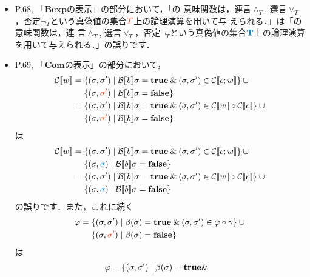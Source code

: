 \documentclass[12pt,titlepage,twoside,openright,dvipdfmx]{jsbook}
\newcommand\old[1]{%
  \textcolor[rgb]{1.0,0.25,0.1}{#1}%
  }
\newcommand\new[1]{%
  \textcolor[rgb]{0,0.55,1.0}{#1}%
  }
\theoremstyle{definition}
\begin{document}
\begin{itemize}
  \ifnum{}
  \ifnum{}
\item P.68,
  「$\mathbf{Bexp}$の表示」の部分において，「\termbooleanexpression{}の
  意味関数は，連言$\wedge_T$,
  選言$\vee_T$，否定$\neg_T$という真偽値の集合$\old{T}$上の論理演算を用いて与
  えられる．」は「\termbooleanexpression{}の意味関数は，連
  言$\wedge_T$,
  選言$\vee_T$，否定$\neg_T$という真偽値の集合$\new{\mathbf{T}}$上の論理演算
  を用いて与えられる．」の誤りです．
\item P.69, 「$\mathbf{Com}$の表示」の部分において，
  \begin{align*}
      \denotation{C}{w} = {} & \{(\sigma,\sigma')\mid  \denotation{B}{b}\sigma=\mathbf{true} \AND (\sigma,\sigma')\in\denotation{C}{c;w}\}\cup {}\\
                             & \{(\sigma,\old{\sigma'})\mid  \denotation{B}{b}\sigma=\mathbf{false}\} \\
      = {} & \{(\sigma,\sigma')\mid  \denotation{B}{b}\sigma=\mathbf{true} \AND (\sigma,\sigma')\in \denotation{C}{w} \circ \denotation{C}{c} \}\cup {}\\
                             & \{(\sigma,\old{\sigma'})\mid  \denotation{B}{b}\sigma=\mathbf{false}\}
  \end{align*}
  は
  \begin{align*}
      \denotation{C}{w} = {} & \{(\sigma,\sigma')\mid  \denotation{B}{b}\sigma=\mathbf{true} \AND (\sigma,\sigma')\in\denotation{C}{c;w}\}\cup {}\\
                             & \{(\sigma,\new{\sigma})\mid  \denotation{B}{b}\sigma=\mathbf{false}\} \\
      = {} & \{(\sigma,\sigma')\mid  \denotation{B}{b}\sigma=\mathbf{true} \AND (\sigma,\sigma')\in \denotation{C}{w} \circ \denotation{C}{c} \}\cup {}\\
                             & \{(\sigma,\new{\sigma})\mid  \denotation{B}{b}\sigma=\mathbf{false}\}
  \end{align*}
  の誤りです．また，これに続く
  \begin{align*}
    \varphi = {} & \{(\sigma,\sigma')\mid \beta(\sigma)=\mathbf{true} \AND
                   (\sigma,\sigma')\in \varphi\circ\gamma \} \cup {} \\
                 & \{(\sigma,\old{\sigma'})\mid \beta(\sigma)=\mathbf{false} \}
  \end{align*}
  は
  \begin{align*}
    \varphi = {} & \{(\sigma,\sigma')\mid \beta(\sigma)=\mathbf{true} \AND

\end{align*}
\end{itemize}
\end{document}
